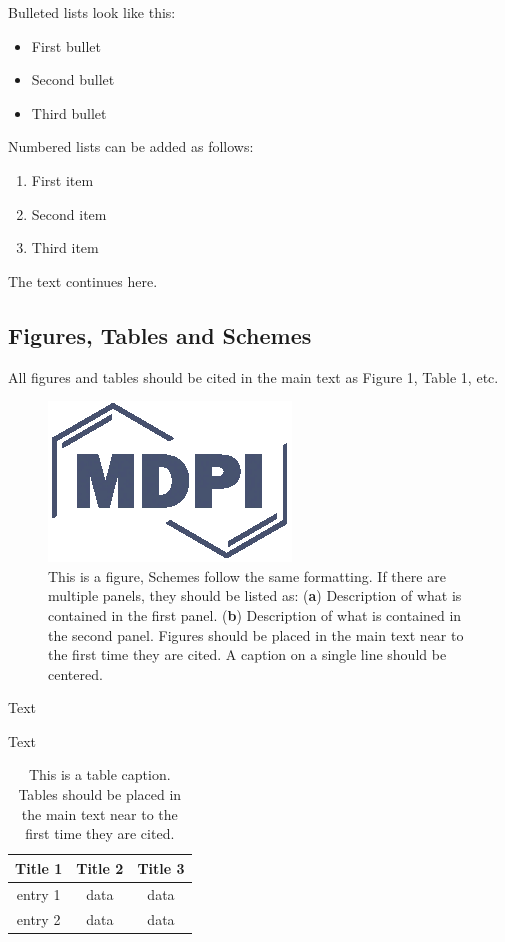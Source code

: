 \documentclass[journal,article,submit,moreauthors,pdftex,10pt,a4paper]{Definitions/mdpi}
\theoremstyle{plain}
\theoremstyle{definition}
\theoremstyle{remark}
\begin{document}
Bulleted lists look like this:
\begin{itemize}[leftmargin=*,labelsep=5.8mm]
\item	First bullet
\item	Second bullet
\item	Third bullet
\end{itemize}

Numbered lists can be added as follows:
\begin{enumerate}[leftmargin=*,labelsep=4.9mm]
\item	First item 
\item	Second item
\item	Third item
\end{enumerate}

The text continues here.

\subsection{Figures, Tables and Schemes}

All figures and tables should be cited in the main text as Figure 1, Table 1, etc.

\begin{figure}[H]
\centering
\includegraphics[width=2 cm]{Definitions/logo-mdpi}
\caption{This is a figure, Schemes follow the same formatting. If there are multiple panels, they should be listed as: (\textbf{a}) Description of what is contained in the first panel. (\textbf{b}) Description of what is contained in the second panel. Figures should be placed in the main text near to the first time they are cited. A caption on a single line should be centered.}
\end{figure}   
 
Text

Text

\begin{table}[H]
\caption{This is a table caption. Tables should be placed in the main text near to the first time they are cited.}
\centering
\begin{tabular}{ccc}
\toprule
\textbf{Title 1}	& \textbf{Title 2}	& \textbf{Title 3}\\
\midrule
entry 1		& data			& data\\
entry 2		& data			& data\\
\bottomrule
\end{tabular}
\end{table}
\end{document}
